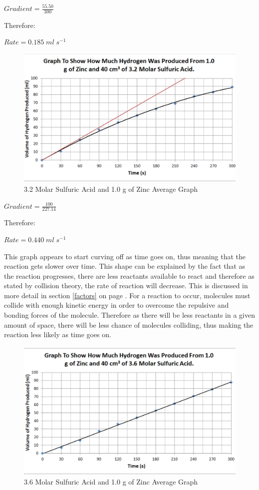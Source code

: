 $Gradient = \frac{55.50}{300}$

Therefore:

$Rate = 0.185 \; ml \; s^{-1}$

\begin{figure}[H]
    \includegraphics[width=\textwidth]{./Analysis/Images/1NonCatalyst/32Molar.pdf}
    \caption{3.2 Molar Sulfuric Acid and 1.0 g of Zinc Average Graph} \label{fig:32MolarSAGradient}
\end{figure}

$Gradient = \frac{100}{227.14}$

Therefore:

$Rate = 0.440 \; ml \; s^{-1}$

This graph appears to start curving off as time goes on, thus meaning that the reaction gets slower over time. This shape can be explained by the fact that as the reaction progresses, there are less reactants available to react and therefore as stated by collision theory, the rate of reaction will decrease. This is discussed in more detail in section \ref{factors} on page \pageref{factors}. For a reaction to occur, molecules must collide with enough kinetic energy in order to overcome the repulsive and bonding forces of the molecule. Therefore as there will be less reactants in a given amount of space, there will be less chance of molecules colliding, thus making the reaction less likely as time goes on. 

\begin{figure}[H]
    \includegraphics[width=\textwidth]{./Analysis/Images/1NonCatalyst/36Molar.pdf}
    \caption{3.6 Molar Sulfuric Acid and 1.0 g of Zinc Average Graph} \label{fig:36MolarSAGradient}
\end{figure}

